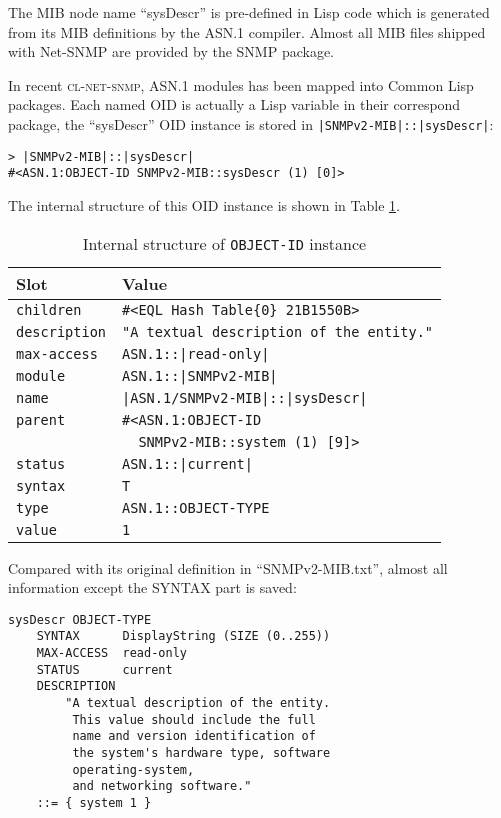 \documentclass[reprint,natbib,9pt]{sigplanconf}
\begin{document}
The MIB node name ``sysDescr'' is pre-defined in Lisp code which is
generated from its MIB definitions by the ASN.1 compiler. Almost all MIB
files shipped with Net-SNMP are provided by the SNMP package.

In recent \textsc{cl-net-snmp}, ASN.1 modules has been mapped
into Common Lisp packages. Each named OID is actually a Lisp variable
in their correspond package, the ``sysDescr'' OID instance is stored
in \texttt{|SNMPv2-MIB|::|sysDescr|}:
\begin{verbatim}
> |SNMPv2-MIB|::|sysDescr|
#<ASN.1:OBJECT-ID SNMPv2-MIB::sysDescr (1) [0]>
\end{verbatim}
The internal structure of this OID instance is shown in Table
\ref{table:object-id}.

\begin{table}
  \centering
  \caption{Internal structure of \texttt{OBJECT-ID} instance}
  \label{table:object-id}
  \begin{tabular}{|l|l|}
    \hline
    \textbf{Slot} & \textbf{Value}\\
    \hline
    \texttt{children} & \texttt{\#<EQL Hash Table\{0\} 21B1550B>}\\
    \texttt{description} & \texttt{"A textual description of the entity."}\\
    \texttt{max-access} & \texttt{ASN.1::|read-only|}\\
    \texttt{module} & \texttt{ASN.1::|SNMPv2-MIB|}\\
    \texttt{name} & \texttt{|ASN.1/SNMPv2-MIB|::|sysDescr|}\\
    \texttt{parent} & \texttt{\#<ASN.1:OBJECT-ID}\\
    & \texttt{\ \ SNMPv2-MIB::system (1) [9]>}\\
    \texttt{status} & \texttt{ASN.1::|current|}\\
    \texttt{syntax} & \texttt{T}\\
    \texttt{type} & \texttt{ASN.1::OBJECT-TYPE}\\
    \texttt{value} & \texttt{1}\\
    \hline
  \end{tabular}
\end{table}

Compared with its original definition in ``SNMPv2-MIB.txt'', almost
all information except the SYNTAX part is saved:

\begin{verbatim}
sysDescr OBJECT-TYPE
    SYNTAX      DisplayString (SIZE (0..255))
    MAX-ACCESS  read-only
    STATUS      current
    DESCRIPTION
        "A textual description of the entity.
         This value should include the full
         name and version identification of
         the system's hardware type, software
         operating-system,
         and networking software."
    ::= { system 1 }
\end{verbatim}
\end{document}
